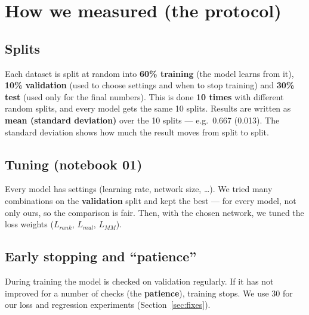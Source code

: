 \documentclass[11pt]{article}
\begin{document}
\section{How we measured (the protocol)}

\subsection{Splits}
Each dataset is split at random into \textbf{60\% training} (the model learns from it), \textbf{10\%
validation} (used to choose settings and when to stop training) and \textbf{30\% test} (used only for
the final numbers). This is done \textbf{10 times} with different random splits, and every model gets
the same 10 splits. Results are written as \textbf{mean (standard deviation)} over the 10 splits ---
e.g.\ 0.667 (0.013). The standard deviation shows how much the result moves from split to split.

\subsection{Tuning (notebook 01)}
Every model has settings (learning rate, network size, \dots). We tried many combinations on the
\textbf{validation} split and kept the best --- for every model, not only ours, so the comparison is
fair. Then, with the chosen network, we tuned the loss weights ($L_{rank}$, $L_{mul}$, $L_{MM}$).

\subsection{Early stopping and ``patience''}
During training the model is checked on validation regularly. If it has not improved for a number of
checks (the \textbf{patience}), training stops. We use 30 for our loss and regression experiments
(Section~\ref{sec:fixes}).
\end{document}
